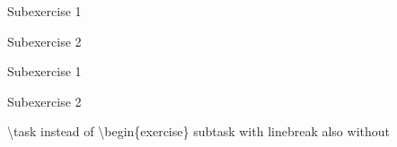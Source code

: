 \documentclass[
    11pt,
    indent=0pt,
    style=underline,
    pointtable,
    exercisepoints,
    exerciseindent=2em,
    exerciseprefix=Ex,
    tikz=no,
    displaydate=yes,
    exercisename=Exercise,
    worksheetname=Worksheet,
    tutorialname=Tutorial,
    groupname=Group,
]{../template/exercisesheet}
\date{3. November 1971}
\begin{document}
\begin{exercise}[4]
    \begin{subexercise}
        Subexercise 1
    \end{subexercise}
    \begin{subexercise}
        Subexercise 2
    \end{subexercise}
\end{exercise}
\begin{exercise}[6]
    \begin{subexercise}
        Subexercise 1
    \end{subexercise}
    \begin{subexercise*}
        Subexercise 2
    \end{subexercise*}
\end{exercise}

\textbackslash{}task instead of \textbackslash{}begin\{exercise\}
\subtask{} subtask with linebreak
\Subtask{} also without
\end{document}
